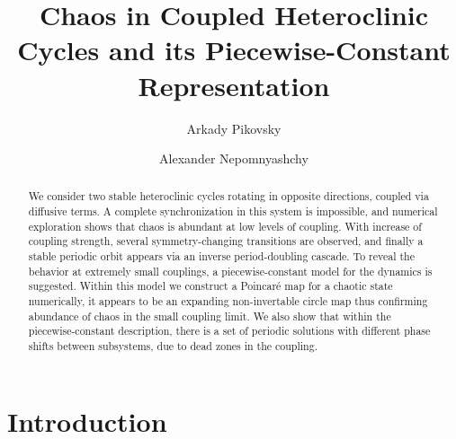 \documentclass[3p,number,review,sort&compress]{elsarticle}
\newcommand{\AN}[1]{{\color{green}AN: #1}}
\begin{document}

\title{Chaos in Coupled Heteroclinic Cycles and its Piecewise-Constant Representation}

\author[up,hse]{Arkady Pikovsky}%
\author[tech]{Alexander Nepomnyashchy}
\address[up]{%
 Institute for Physics and Astronomy,  University of Potsdam, 
 Karl-Liebknecht Str. 24/25,
 14476 Potsdam, Germany 
}%
\address[hse]{National Research University Higher School of Economics,  Nizhny Novgorod, Russia}
\address[tech]{ Department of Mathematics, Technion - Israel Institute of Technology, Haifa, Israel}
\begin{abstract}
We consider two stable heteroclinic cycles rotating in opposite directions, coupled via diffusive terms. A complete synchronization in this system is impossible, and numerical exploration shows that chaos is abundant
at low levels
of coupling. With increase of coupling strength, several symmetry-changing transitions are observed, and finally a stable periodic orbit appears via an inverse period-doubling cascade. To reveal the behavior at extremely small couplings, a piecewise-constant model for the dynamics is suggested. Within this model we construct a Poincar\'e map for a chaotic state
numerically, it appears to be an expanding non-invertable circle map thus confirming abundance of chaos in the small coupling limit. We also show that
within the piecewise-constant description, there is a set of periodic solutions with different phase shifts between subsystems, due to dead zones in the coupling.
\end{abstract}


\maketitle

\section{Introduction}
\label{sec:intro}
\end{document}
